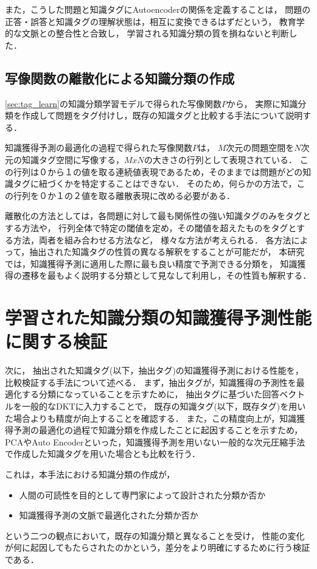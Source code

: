 また，こうした問題と知識タグにAutoencoderの関係を定義することは，
問題の正答・誤答と知識タグの理解状態は，相互に変換できるはずだという，
教育学的な文脈との整合性と合致し，
学習される知識分類の質を損ねないと判断した．


\subsection{写像関数の離散化による知識分類の作成}
\ref{sec:tag_learn}の知識分類学習モデルで得られた写像関数$P$から，
実際に知識分類を作成して問題をタグ付けし，既存の知識タグと比較する手法について説明する．


知識獲得予測の最適化の過程で得られた写像関数$P$は，
$M$次元の問題空間を$N$次元の知識タグ空間に写像する，$MxN$の大きさの行列として表現されている．
この行列は０から１の値を取る連続値表現であるため，そのままでは問題がどの知識タグに紐づくかを特定することはできない．
そのため，何らかの方法で，この行列を０か１の２値を取る離散表現に改める必要がある．

離散化の方法としては，各問題に対して最も関係性の強い知識タグのみをタグとする方法や，
行列全体で特定の閾値を定め，その閾値を超えたものをタグとする方法，両者を組み合わせる方法など，
様々な方法が考えられる．
各方法によって，抽出された知識タグの性質の異なる解釈をすることが可能だが，
本研究では，知識獲得予測に適用した際に最も良い精度で予測できる分類を，
知識獲得の遷移を最もよく説明する分類として見なして利用し，その性質も解釈する．









\section{学習された知識分類の知識獲得予測性能に関する検証}
次に，
抽出された知識タグ(以下，抽出タグ)の知識獲得予測における性能を，比較検証する手法について述べる．
まず，抽出タグが，知識獲得の予測性を最適化する分類になっていることを示すために，
抽出タグに基づいた回答ベクトルを一般的なDKTに入力することで，
既存の知識タグ(以下，既存タグ)を用いた場合よりも精度が向上することを確認する．
また，この精度向上が，知識獲得予測の最適化の過程で知識分類を作成したことに起因することを示すため，
PCAやAuto Encoderといった，知識獲得予測を用いない一般的な次元圧縮手法で作成した知識タグを用いた場合とも比較を行う．

これは，本手法における知識分類の作成が，
\begin{itemize}
	\item 人間の可読性を目的として専門家によって設計された分類か否か
	\item 知識獲得予測の文脈で最適化された分類か否か
\end{itemize}
という二つの観点において，既存の知識分類と異なることを受け，
性能の変化が何に起因してもたらされたのかという，差分をより明確にするために行う検証である．





